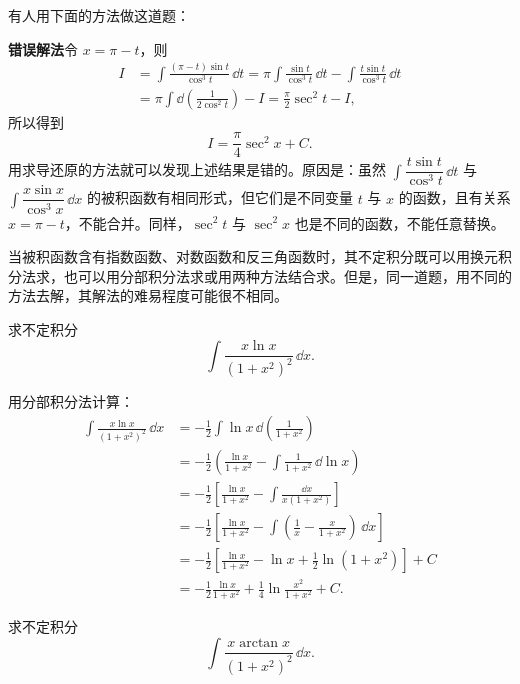 \begin{xremark}
有人用下面的方法做这道题：

\textbf{错误解法}\quad 令 $x=\pi-t$，则
\begin{align*}
  I
  &=\int\frac{(\pi-t)\sin t}{\cos^3t}\,\dd t
   =\pi\int\frac{\sin t}{\cos^3t}\,\dd t
    -\int\frac{t\sin t}{\cos^3t}\,\dd t\\
  &=\pi\int\dd\left(\frac1{2\cos^2t}\right)-I
   =\frac\pi2\sec^2t-I,
\end{align*}
所以得到
\[
  I=\frac\pi4\sec^2x+C.
\]
用求导还原的方法就可以发现上述结果是错的。原因是：虽然 $\int\dfrac{t\sin t}{\cos^3t}\,\dd t$ 与 $\int\dfrac{x\sin x}{\cos^3x}\,\dd x$ 的被积函数有相同形式，但它们是不同变量 $t$ 与 $x$ 的函数，且有关系 $x=\pi-t$，不能合并。同样，$\sec^2t$ 与 $\sec^2x$ 也是不同的函数，不能任意替换。
\end{xremark}

当被积函数含有指数函数、对数函数和反三角函数时，其不定积分既可以用换元积分法求，也可以用分部积分法求或用两种方法结合求。但是，同一道题，用不同的方法去解，其解法的难易程度可能很不相同。

\begin{xexample}[9.1.5]
求不定积分
\[
  \int\frac{x\ln x}{(1+x^2)^2}\,\dd x.
\]
\end{xexample}

\begin{xsolution}
用分部积分法计算：
\begin{align*}
  \int\frac{x\ln x}{(1+x^2)^2}\,\dd x
  &=-\frac12\int\ln x\,\dd\left(\frac1{1+x^2}\right)\\
  &=-\frac12\left(\frac{\ln x}{1+x^2}-\int\frac1{1+x^2}\,\dd\ln x\right)\\
  &=-\frac12\left[\frac{\ln x}{1+x^2}-\int\frac{\dd x}{x(1+x^2)}\right]\\
  &=-\frac12\left[\frac{\ln x}{1+x^2}-\int\left(\frac1x-\frac{x}{1+x^2}\right)\,\dd x\right]\\
  &=-\frac12\left[\frac{\ln x}{1+x^2}-\ln x+\frac12\ln(1+x^2)\right]+C\\
  &=-\frac12\frac{\ln x}{1+x^2}+\frac14\ln\frac{x^2}{1+x^2}+C.
\end{align*}
\end{xsolution}

\begin{xexample}[9.1.6]
求不定积分
\[
  \int\frac{x\arctan x}{(1+x^2)^2}\,\dd x.
\]
\end{xexample}

